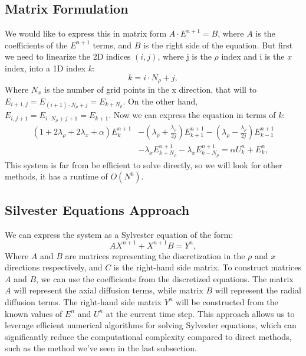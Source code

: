 \documentclass{article}
\begin{document}
\subsection*{Matrix Formulation}
We would like to express this in matrix form $A\cdot E^{n+1} = B$, where $A$ is 
the coefficients of the $E^{n+1}$ terms, and $B$ is the right side of the equation.
But first we need to linearize the 2D indices $(i,j)$, where j is the $\rho$ index and i is the $x$ index, into a 1D index $k$:
\begin{equation}
k = i\cdot N_\rho + j,
\end{equation}
Where $N_x$ is the number of grid points in the x direction, that will to $E_{i+1,j} = E_{(i+1)\cdot N_\rho + j} = E_{k+N_\rho}$.
On the other hand, $E_{i,j+1} = E_{i\cdot N_\rho + j + 1} = E_{k+1}$. Now we can express the equation in terms of $k$:
\begin{equation}
\begin{split}
(1 + 2\lambda_{\rho} + 2\lambda_x + \alpha)E^{n+1}_{k} & - (\lambda_{\rho} + \frac{\lambda_{\rho}}{2j})E^{n+1}_{k+1} - (\lambda_{\rho} - \frac{\lambda_{\rho}}{2j})E^{n+1}_{k-1} \\
& - \lambda_x E^{n+1}_{k+N_\rho} - \lambda_x E^{n+1}_{k-N_\rho} = \alpha U^{n}_{k} + E^{n}_{k},
\end{split}
\end{equation}
This system is far from be efficient to solve directly, so we will look for other methods, it has a runtime of $O(N^6)$.

\subsection*{Silvester Equations Approach}
We can express the system as a Sylvester equation of the form:
\begin{equation}
A X^{n+1} + X^{n+1} B = Y^{n},
\end{equation}
Where $A$ and $B$ are matrices representing the discretization in the $\rho$ and $x$ directions respectively, and $C$ is the right-hand side matrix.
To construct matrices $A$ and $B$, we can use the coefficients from the discretized equations. The matrix $A$ will represent the axial diffusion terms, while matrix $B$ will represent the radial diffusion terms.
The right-hand side matrix $Y^{n}$ will be constructed from the known values of $E^{n}$ and $U^{n}$ at the current time step.
This approach allows us to leverage efficient numerical algorithms for solving Sylvester equations, which can significantly reduce
the computational complexity compared to direct methods, such as the method we've seen in the last subsection.
\end{document}
